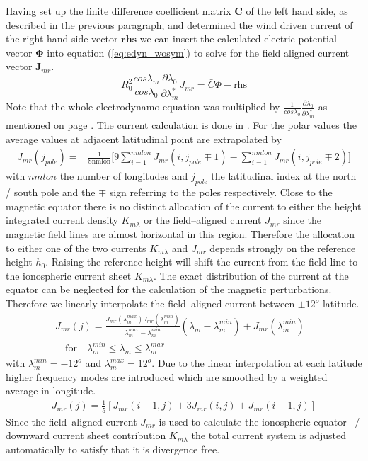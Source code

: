 Having set up the finite difference coefficient matrix $\bar{\mathbf{C}}$ of the 
left hand side, as described
in the previous paragraph, and determined the wind driven current of the right
hand side vector $\mathbf{rhs}$ we can insert the 
calculated electric potential vector $\mathbf{\Phi}$ 
into equation
(\ref{eq:edyn_wosym}) to solve for the field aligned current vector $\mathbf{J}_{mr}$.
%
\begin{equation}
   R_0^2 \frac{cos \lambda_m}{cos \lambda_0}
  \frac{\partial \lambda_0}{\partial \lambda_m^*} J_{mr} = \bar{C} \Phi - \text{rhs} \label{eq:jmr_solve}
\end{equation}
%
Note that the whole electrodynamo equation was multiplied by
$\frac{1}{cos \lambda_0}\frac{\partial \lambda_0}{\partial \lambda_m^*}$ as mentioned 
on page \pageref{page:electro_multi}. The current calculation is done
in . For the polar values the average values at
adjacent latitudinal point are extrapolated by
%
\begin{align}
  J_{mr} (j_{pole})= & \frac{1}{8 \text{nmlon}} \bigl[ 
     9\sum_{i=1}^{nmlon} {J}_{mr} (i,j_{pole} \mp 1)
    - \sum_{i=1}^{nmlon} {J}_{mr} (i,j_{pole} \mp 2)\bigr] 
\end{align}
%
with $nmlon$ the number of longitudes and $j_{pole}$ the latitudinal index at
the north / south pole and the $\mp$ sign referring to the poles
respectively. 
Close to the magnetic equator there is no distinct allocation of the
current to either the height integrated current density $K_{m \lambda}$
or the field--aligned current $J_{mr}$ since the magnetic field lines are
almost horizontal in this region. Therefore the allocation to either one of 
the two currents $K_{m \lambda}$ and $J_{mr}$ depends strongly on the 
reference height $h_0$. Raising the reference height will shift the current 
from the field line to the ionospheric current sheet $K_{m \lambda}$. The 
exact distribution of the current at the equator can be neglected for the
calculation of the magnetic perturbations. Therefore we linearly interpolate 
the field--aligned current between $\pm 12^o$ latitude.
%
\begin{align}
  J_{mr} (j)= \frac{J_{mr}(\lambda_m^{max}) J_{mr}(\lambda_m^{min}) }
  {\lambda_m^{max} - \lambda_m^{min}} (\lambda_m-\lambda_m^{min}) 
  + J_{mr} (\lambda_m^{min}) & \\
    \quad \text{for} \quad \lambda_m^{min} \leq \lambda_m \leq \lambda_m^{max} &
\end{align}
% 
with $\lambda_m^{min} = -12^o$ and $\lambda_m^{max} = 12^o$. 
Due to the linear interpolation at each latitude
higher frequency modes are introduced which are smoothed by a weighted
average in longitude.
%
\begin{align}
  J_{mr} (j)= \frac{1}{5} [J_{mr}(i+1,j) + 3 J_{mr}(i,j) + J_{mr}(i-1,j)  ]
\end{align}
% 
Since the field--aligned
current $J_{mr}$ is used to calculate the ionospheric equator-- / 
downward current sheet contribution
 $K_{m \lambda}$ the total current system
 is adjusted automatically to satisfy that it is divergence free.
 
